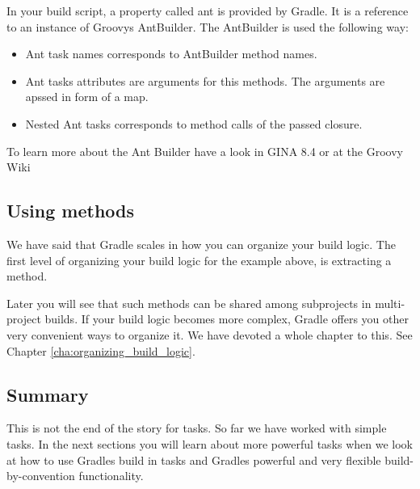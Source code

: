 
In your build script, a property called ant is provided by Gradle. It is a reference to an instance of Groovys AntBuilder. The AntBuilder is used the following way:
\begin{itemize}
\item Ant task names corresponds to AntBuilder method names.
\item Ant tasks attributes are arguments for this methods. The arguments are apssed in form of a map.
\item Nested Ant tasks corresponds to method calls of the passed closure.
\end{itemize}
To learn more about the Ant Builder have a look in GINA 8.4 or at the Groovy Wiki

\subsection{Using methods}
We have said that Gradle scales in how you can organize your build logic. The first level of organizing your build logic for the example above, is extracting a method.


\noindent Later you will see that such methods can be shared among subprojects in multi-project builds. If your build logic becomes more complex, Gradle offers you other very convenient ways to organize it. We have devoted a whole chapter to this. See Chapter \ref{cha:organizing_build_logic}. 

\subsection{Summary}
This is not the end of the story for tasks. So far we have worked with simple tasks. In the next sections you will learn about more powerful tasks when we look at how to use Gradles build in tasks and Gradles powerful and very flexible build-by-convention functionality.

